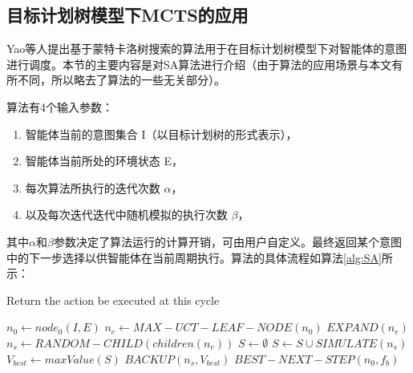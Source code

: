 
\subsection{目标计划树模型下MCTS的应用}\label{SA}
Yao等人提出基于蒙特卡洛树搜索的\SA \cite{DBLP:conf/atal/YaoL16}算法用于在目标计划树模型下对智能体的意图进行调度。本节的主要内容是对SA算法进行介绍（由于\SA 算法的应用场景与本文有所不同，所以略去了算法的一些无关部分）。

\SA 算法有4个输入参数：
\begin{enumerate}
  \item 智能体当前的意图集合 I（以目标计划树的形式表示），
  \item 智能体当前所处的环境状态 E，
  \item 每次算法所执行的迭代次数 $\alpha$， 
  \item 以及每次迭代迭代中随机模拟的执行次数 $\beta$，
\end{enumerate}
其中$\alpha$和$\beta$参数决定了算法运行的计算开销，可由用户自定义。\SA 最终返回某个意图中的下一步选择以供智能体在当前周期执行。\SA 算法的具体流程如算法\ref{alg:SA}所示：

\begin{algorithm}
\caption{Return the action be executed at this cycle}\label{alg:SA}
  \begin{algorithmic}[1]
    \STATE $n_0 \gets node_0(I,E)$ \label{root}
     \label{iteration begin}
      \STATE $n_e \gets MAX-UCT-LEAF-NODE(n_0)$ \label{selection}
      \STATE $EXPAND(n_e)$ \label{expansion}
      \STATE $n_s \gets RANDOM-CHILD(children(n_e))$ \label{simulation begin}
      \STATE $S \gets \emptyset$
        \STATE $S \gets S \cup SIMULATE(n_s)$
      \ENDFOR \label{simulation end}
      \STATE $V_{best} \gets maxValue(S)$
      \STATE $BACKUP(n_s, V_{best})$ \label{back}
      \ENDFOR \label{iteration end}
      \STATE \RETURN $BEST-NEXT-STEP(n_0, f_b)$
  \end{algorithmic}
\end{algorithm}

